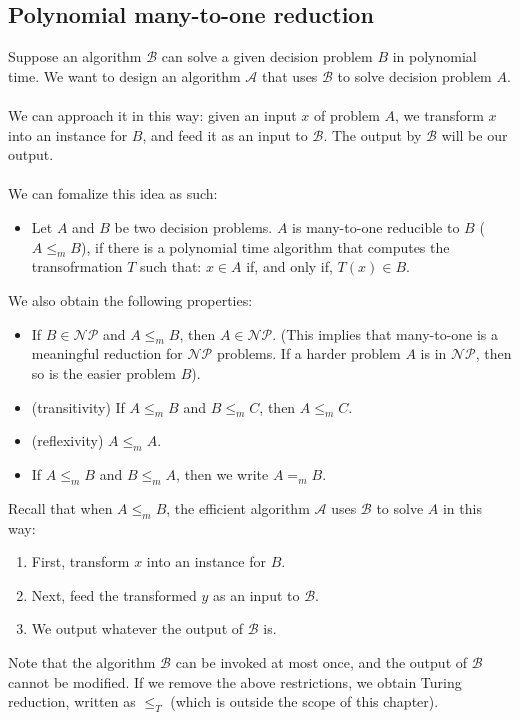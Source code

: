 \documentclass[a4paper]{article}
\begin{document}
\subsection{Polynomial many-to-one reduction}
Suppose an algorithm $\mathcal{B}$ can solve a given decision problem $B$ in polynomial time. We want to design an algorithm $\mathcal{A}$ that uses $\mathcal{B}$ to solve decision problem $A$.\\\\
We can approach it in this way: given an input $x$ of problem $A$, we transform $x$ into an instance for $B$, and feed it as an input to $\mathcal{B}$. The output by $\mathcal{B}$ will be our output.\\\\
We can fomalize this idea as such:
\begin{itemize}
	\item[] Let $A$ and $B$ be two decision problems. $A$ is many-to-one reducible to $B$ ($A\le_m B$), if there is a polynomial time algorithm that computes the transofrmation $T$ such that: $x\in A$ if, and only if, $T(x) \in B$.
\end{itemize}
We also obtain the following properties:
\begin{itemize}
	\item If $B \in \mathcal{NP}$ and $A\le_m B$, then $A \in \mathcal{NP}$. (This implies that many-to-one is a meaningful reduction for $\mathcal{NP}$ problems. If a harder problem $A$ is in $\mathcal{NP}$, then so is the easier problem $B$).
	\item (transitivity) If $A \le_m B$ and $B \le_m C$, then $A \le_m C$.
	\item (reflexivity) $A \le_m A$.
	\item If $A \le_m B$ and $B \le_m A$, then we write $A =_m B$.
\end{itemize}
Recall that when $A \le_m B$, the efficient algorithm $\mathcal{A}$ uses $\mathcal{B}$ to solve $A$ in this way:
\begin{enumerate}
	\item First, transform $x$ into an instance for $B$.
	\item Next, feed the transformed $y$ as an input to $\mathcal{B}$.
	\item We output whatever the output of $\mathcal{B}$ is.
\end{enumerate}
Note that the algorithm $\mathcal{B}$ can be invoked at most once, and the output of $\mathcal{B}$ cannot be modified. If we remove the above restrictions, we obtain Turing reduction, written as $\le_T$ (which is outside the scope of this chapter).
\end{document}
